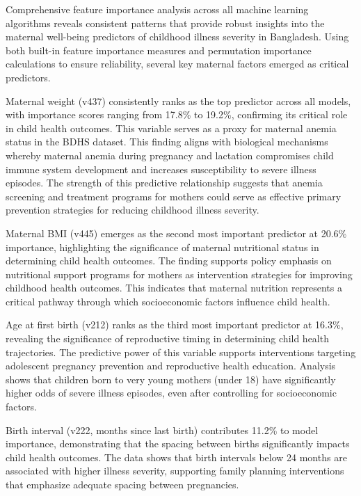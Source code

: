 \documentclass[12pt]{report}
\begin{document}
Comprehensive feature importance analysis across all machine learning algorithms reveals consistent patterns that provide robust insights into the maternal well-being predictors of childhood illness severity in Bangladesh. Using both built-in feature importance measures and permutation importance calculations to ensure reliability, several key maternal factors emerged as critical predictors.

Maternal weight (v437) consistently ranks as the top predictor across all models, with importance scores ranging from 17.8\% to 19.2\%, confirming its critical role in child health outcomes. This variable serves as a proxy for maternal anemia status in the BDHS dataset. This finding aligns with biological mechanisms whereby maternal anemia during pregnancy and lactation compromises child immune system development and increases susceptibility to severe illness episodes. The strength of this predictive relationship suggests that anemia screening and treatment programs for mothers could serve as effective primary prevention strategies for reducing childhood illness severity.

Maternal BMI (v445) emerges as the second most important predictor at 20.6\% importance, highlighting the significance of maternal nutritional status in determining child health outcomes. The finding supports policy emphasis on nutritional support programs for mothers as intervention strategies for improving childhood health outcomes. This indicates that maternal nutrition represents a critical pathway through which socioeconomic factors influence child health.

Age at first birth (v212) ranks as the third most important predictor at 16.3\%, revealing the significance of reproductive timing in determining child health trajectories. The predictive power of this variable supports interventions targeting adolescent pregnancy prevention and reproductive health education. Analysis shows that children born to very young mothers (under 18) have significantly higher odds of severe illness episodes, even after controlling for socioeconomic factors.

Birth interval (v222, months since last birth) contributes 11.2\% to model importance, demonstrating that the spacing between births significantly impacts child health outcomes. The data shows that birth intervals below 24 months are associated with higher illness severity, supporting family planning interventions that emphasize adequate spacing between pregnancies.
\end{document}
